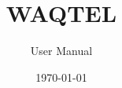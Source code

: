 \documentclass[Waqtel]{../../data/TelemacDoc} %
\begin{document}
\let\cleardoublepage\clearpage

\title{WAQTEL}
\subtitle{User Manual}
\version{\telmaversion}
\date{\today}
\maketitle
\clearpage



\newpage

\thispagestyle{empty}

\TelemacCopyright{}




\pagestyle{empty} %

\tableofcontents%


\pagestyle{fancy} %








\end{document}
